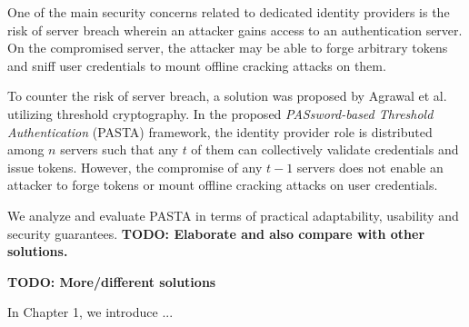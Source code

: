 \documentclass[article]{aaltoseries}
\newcommand{\todo}[1]{}
\renewcommand{\todo}[1]{{\color{red} \textbf{TODO: {#1}}}}
\begin{document}
One of the main security concerns related to dedicated identity providers is the risk of server breach wherein an attacker gains access to an authentication server. On the compromised server, the attacker may be able to forge arbitrary tokens and sniff user credentials to mount offline cracking attacks on them.

To counter the risk of server breach, a solution was proposed by Agrawal et al.~\cite{pasta} utilizing threshold cryptography. In the proposed \textit{PASsword-based Threshold Authentication} (PASTA) framework, the identity provider role is distributed among $n$ servers such that any $t$ of them can collectively validate credentials and issue tokens. However, the compromise of any $t-1$ servers does not enable an attacker to forge tokens or mount offline cracking attacks on user credentials.

We analyze and evaluate PASTA in terms of practical adaptability, usability and security guarantees. \todo{Elaborate and also compare with other solutions.}

\todo{More/different solutions}

In Chapter 1, we introduce ...








\end{document}
